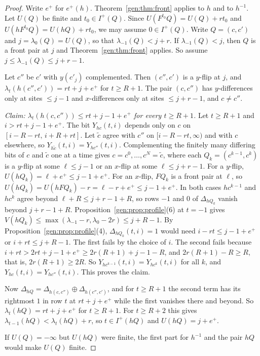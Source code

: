 \begin{proof}
Write $e^+$ for $e^+(h)$. Theorem~\ref{gen:thm:front} applies to $h$ and to $h^{-1}$. Let $U(Q)$ be finite and $t_0\in I^+(Q)$. Since $U(F^{t_0}Q)=U(Q)+rt_0$ and $U(hF^{t_0}Q)=U(hQ)+rt_0$, we may assume $0\in I^+(Q)$. Write $Q=(c,c')$ and $j=\lambda_0(Q)=U(Q)$, so that $\lambda_{-1}(Q)<j+r$. If $\lambda_{-1}(Q)<j$, then $Q$ is a front pair at $j$ and Theorem~\ref{gen:thm:front} applies. So assume $j\le\lambda_{-1}(Q)\le j+r-1$.

Let $c''$ be $c'$ with $y(c'_j)$ complemented. Then $(c'',c')$ is a $y$-flip at $j$, and $\lambda_t(h(c'',c'))=rt+j+e^+$ for $t\ge R+1$. The pair $(c,c'')$ has $y$-differences only at sites $\le j-1$ and $x$-differences only at sites $\le j+r-1$, and $c\ne c''$.

\emph{Claim: $\lambda_t(h(c,c''))\le rt+j-1+e^+$ for every $t\ge R+1$.} Let $t\ge R+1$ and $i>rt+j-1+e^+$. The bit $Y_{hc}(t,i)$ depends only on $c$ on $[i-R-rt,\,i+R+rt]$. Let $\tilde c$ agree with $c''$ on $[i-R-rt,\infty)$ and with $c$ elsewhere, so $Y_{h\tilde c}(t,i)=Y_{hc''}(t,i)$. Complementing the finitely many differing bits of $c$ and $\tilde c$ one at a time gives $c=c^0,\dots,c^N=\tilde c$, where each $Q_k=(c^{k-1},c^k)$ is a $y$-flip at some $\ell\le j-1$ or an $x$-flip at some $\ell\le j+r-1$. For a $y$-flip, $U(hQ_k)=\ell+e^+\le j-1+e^+$. For an $x$-flip, $FQ_k$ is a front pair at $\ell$, so $U(hQ_k)=U(hFQ_k)-r=\ell-r+e^+\le j-1+e^+$. In both cases $hc^{k-1}$ and $hc^k$ agree beyond $\ell+R\le j+r-1+R$, so rows $-1$ and $0$ of $\Delta_{hQ_k}$ vanish beyond $j+r-1+R$. Proposition~\ref{gen:prop:profile}(6) at $t=-1$ gives $V(hQ_k)\le\max(\lambda_{-1}-r,\lambda_0-2r)\le j+R-1$. By Proposition~\ref{gen:prop:profile}(4), $\Delta_{hQ_k}(t,i)=1$ would need $i-rt\le j-1+e^+$ or $i+rt\le j+R-1$. The first fails by the choice of $i$. The second fails because $i+rt>2rt+j-1+e^+\ge2r(R+1)+j-1-R$, and $2r(R+1)-R\ge R$, that is, $2r(R+1)\ge2R$. So $Y_{hc^{k-1}}(t,i)=Y_{hc^k}(t,i)$ for all $k$, and $Y_{hc}(t,i)=Y_{hc''}(t,i)$. This proves the claim.

Now $\Delta_{hQ}=\Delta_{h(c,c'')}\oplus\Delta_{h(c'',c')}$, and for $t\ge R+1$ the second term has its rightmost $1$ in row $t$ at $rt+j+e^+$ while the first vanishes there and beyond. So $\lambda_t(hQ)=rt+j+e^+$ for $t\ge R+1$. For $t\ge R+2$ this gives $\lambda_{t-1}(hQ)<\lambda_t(hQ)+r$, so $t\in I^+(hQ)$ and $U(hQ)=j+e^+$.

If $U(Q)=-\infty$ but $U(hQ)$ were finite, the first part for $h^{-1}$ and the pair $hQ$ would make $U(Q)$ finite.
\end{proof}

